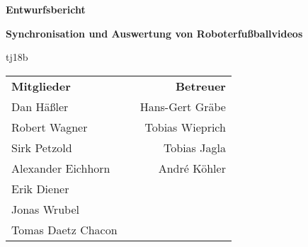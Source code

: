 \begin{titlepage}
\begin{center}
{\Huge\textbf{Entwurfsbericht}\vspace{2em}}

{\Large\textbf{Synchronisation und Auswertung von Roboterfußballvideos}\vspace{1em}}

{\textsf{tj18b}\vspace{2em}}

\begin{table}[b]
\begin{tabularx}{\textwidth}{lXr}
\textbf{Mitglieder}&&\textbf{Betreuer}\\
Dan Häßler&&Hans-Gert Gräbe\\
Robert Wagner&&Tobias Wieprich\\
Sirk Petzold&&Tobias Jagla\\
Alexander Eichhorn&&André Köhler\\
Erik Diener&&\\
Jonas Wrubel&&\\
Tomas Daetz Chacon&&\\
\end{tabularx}
\end{table}
\end{center}
\end{titlepage}